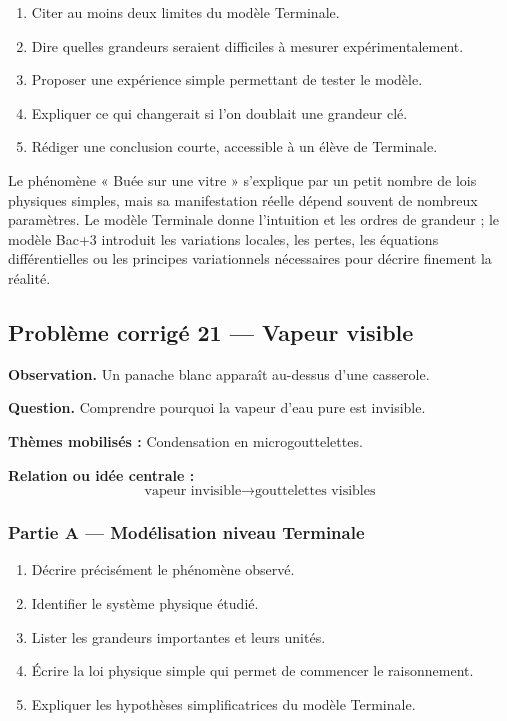 \documentclass[11pt,a4paper]{article}
\begin{document}
\begin{enumerate}
  \item Citer au moins deux limites du modèle Terminale.
  \item Dire quelles grandeurs seraient difficiles à mesurer expérimentalement.
  \item Proposer une expérience simple permettant de tester le modèle.
  \item Expliquer ce qui changerait si l'on doublait une grandeur clé.
  \item Rédiger une conclusion courte, accessible à un élève de Terminale.
\end{enumerate}

\begin{corrigebox}
Le phénomène « Buée sur une vitre » s'explique par un petit nombre de lois physiques simples, mais sa manifestation réelle dépend souvent de nombreux paramètres. Le modèle Terminale donne l'intuition et les ordres de grandeur ; le modèle Bac+3 introduit les variations locales, les pertes, les équations différentielles ou les principes variationnels nécessaires pour décrire finement la réalité.
\end{corrigebox}

\subsection{Problème corrigé 21 — Vapeur visible}

\begin{exercicebox}
\textbf{Observation.} Un panache blanc apparaît au-dessus d'une casserole.

\medskip
\textbf{Question.} Comprendre pourquoi la vapeur d'eau pure est invisible.

\medskip
\textbf{Thèmes mobilisés :} Condensation en microgouttelettes.

\medskip
\textbf{Relation ou idée centrale :}
\[
\text{vapeur invisible}\to\text{gouttelettes visibles}
\]
\end{exercicebox}

\subsubsection*{Partie A — Modélisation niveau Terminale}

\begin{enumerate}
  \item Décrire précisément le phénomène observé.
  \item Identifier le système physique étudié.
  \item Lister les grandeurs importantes et leurs unités.
  \item Écrire la loi physique simple qui permet de commencer le raisonnement.
  \item Expliquer les hypothèses simplificatrices du modèle Terminale.
\end{enumerate}
\end{document}
